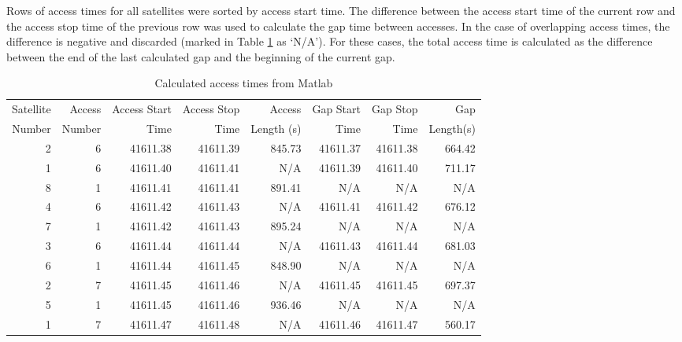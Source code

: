 Rows of access times for all satellites were sorted by access start time. The difference between the access start time of the current row and the access stop time of the previous row was used to calculate the gap time between accesses. In the case of overlapping access times, the difference is negative and discarded (marked in Table \ref{tab:results_matlab} as `N/A'). For these cases, the total access time is calculated as the difference between the end of the last calculated gap and the beginning of the current gap. 
\begin{table}[htbp]
  \centering
  \caption{Calculated access times from Matlab}
    \begin{tabular}{rrrrrrrr}
    \toprule
    Satellite & Access & Access Start & Access  Stop & Access & Gap Start & Gap Stop & Gap \vspace{-3mm} \\
    
    Number & Number & Time & Time & Length (s) & Time & Time & Length(s)\\
    \midrule
    2     & 6     & 41611.38 & 41611.39 & 845.73 & 41611.37 & 41611.38 & 664.42 \\
    1     & 6     & 41611.40 & 41611.41 & N/A  & 41611.39 & 41611.40 & 711.17 \\
    8     & 1     & 41611.41 & 41611.41 & 891.41 & N/A  & N/A  & N/A \\
    4     & 6     & 41611.42 & 41611.43 & N/A  & 41611.41 & 41611.42 & 676.12 \\
    7     & 1     & 41611.42 & 41611.43 & 895.24 & N/A  & N/A  & N/A \\
    3     & 6     & 41611.44 & 41611.44 & N/A  & 41611.43 & 41611.44 & 681.03 \\
    6     & 1     & 41611.44 & 41611.45 & 848.90 & N/A  & N/A  & N/A \\
    2     & 7     & 41611.45 & 41611.46 & N/A  & 41611.45 & 41611.45 & 697.37 \\
    5     & 1     & 41611.45 & 41611.46 & 936.46 & N/A  & N/A  & N/A \\
    1     & 7     & 41611.47 & 41611.48 & N/A  & 41611.46 & 41611.47 & 560.17\\
    \bottomrule
    \end{tabular}%
  \label{tab:results_matlab}%
\end{table}%

